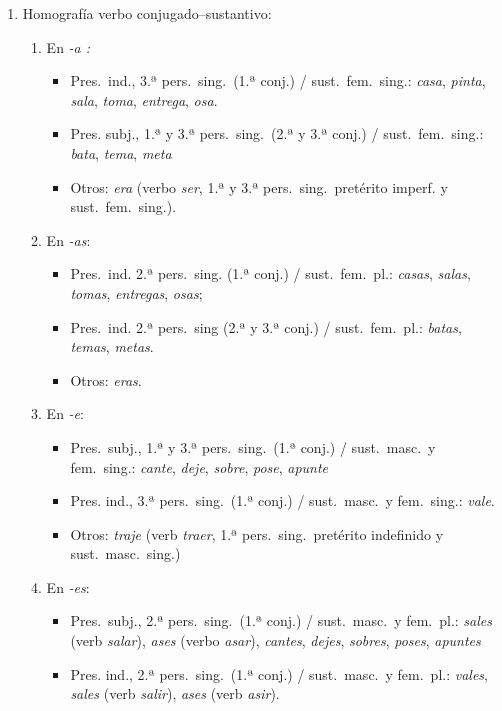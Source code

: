 \begin{enumerate} \item Homografía verbo conjugado--sustantivo: \begin{enumerate} 

\item En \emph{-a :} \begin{itemize} \item Pres.\ ind., 3.ª pers.\  sing.\ (1.ª conj.) / sust.\ fem.\ sing.: \emph{casa}, \emph{pinta}, \emph{ sala}, \emph{toma}, \emph{entrega}, \emph{osa}. \item Pres. subj., 1.ª y 3.ª pers.\ sing.\ (2.ª y 3.ª conj.) / sust.\ fem.\ sing.: \emph{bata}, \emph{tema}, \emph{meta} \item Otros: \emph{era} (verbo \emph{ser}, 1.ª y 3.ª pers.\ sing.\ pretérito imperf.  y sust.\ fem.\  sing.). \end{itemize} 

\item En \emph{-as}: \begin{itemize} \item Pres.\ ind. 2.ª pers.\ sing. (1.ª conj.) / sust.\ fem.\ pl.: \emph{casas}, \emph{salas}, \emph{tomas}, \emph{entregas}, \emph{osas}; \item Pres.\ ind. 2.ª pers.\ sing (2.ª y 3.ª conj.) / sust.\ fem.\ pl.: \emph{batas}, \emph{temas}, \emph{metas}. \item Otros: \emph{eras}. \end{itemize} 

\item En \emph{-e}: \begin{itemize} \item Pres.\ subj., 1.ª y 3.ª pers.\ sing.\ (1.ª conj.) / sust.\ masc.\  y fem.\ sing.: \emph{cante}, \emph{deje}, \emph{sobre}, \emph{pose}, \emph{apunte} \item Pres. ind., 3.ª pers.\ sing.\ (1.ª conj.) / sust.\ masc.\  y fem.\ sing.: \emph{vale}. \item Otros: \emph{traje} (verb \emph{traer}, 1.ª pers.\ sing.\ pretérito indefinido y sust.\ masc.\ sing.) \end{itemize} 

\item En \emph{-es}: \begin{itemize} \item Pres.\ subj., 2.ª pers.\ sing.\ (1.ª conj.) / sust.\ masc.\  y fem.\ pl.: \emph{sales} (verb \emph{salar}), \emph{ases} (verbo \emph{asar}), \emph{cantes}, \emph{dejes}, \emph{sobres}, \emph{poses}, \emph{apuntes} \item Pres. ind., 2.ª pers.\ sing.\ (1.ª conj.) / sust.\ masc.\  y fem.\ pl.: \emph{vales}, \emph{sales} (verb \emph{salir}), \emph{ases} (verb \emph{asir}). \end{itemize} 


\end{enumerate}
\end{enumerate}
